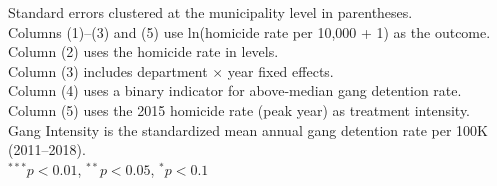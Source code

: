\begin{table}[htbp]
   \par \raggedright 
   Standard errors clustered at the municipality level in parentheses.\\
   Columns (1)--(3) and (5) use ln(homicide rate per 10,000 + 1) as the outcome.\\
   Column (2) uses the homicide rate in levels.\\
   Column (3) includes department $\times$ year fixed effects.\\
   Column (4) uses a binary indicator for above-median gang detention rate.\\
   Column (5) uses the 2015 homicide rate (peak year) as treatment intensity.\\
   Gang Intensity is the standardized mean annual gang detention rate per 100K (2011--2018).\\
   $^{***}p<0.01$, $^{**}p<0.05$, $^{*}p<0.1$
\end{table}


